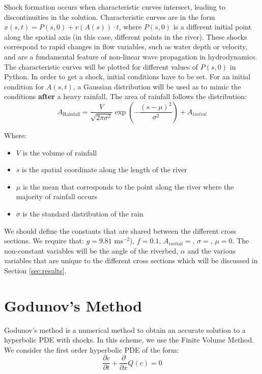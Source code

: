\documentclass[12pt]{article}
\begin{document}
Shock formation occurs when characteristic curves intersect, leading to discontinuities in the solution. Characteristic curves are in the form $ x(s, t) = P(s, 0) + v(A(s))\cdot t$, where $P(s, 0)$ is a different initial point along the spatial axis (in this case, different points in the river). These shocks correspond to rapid changes in flow variables, such as water depth or velocity, and are a fundamental feature of non-linear wave propagation in hydrodynamics. The characteristic curves will be plotted for different values of $P(s, 0)$ in Python. In order to get a shock, initial conditions have to be set. For an initial condition for $A(s, t)$, a Gaussian distribution will be used as to mimic the conditions \textbf{after} a heavy rainfall. The area of rainfall follows the distribution:
\begin{equation}
     A_\text{Rainfall} = \frac{V}{\sqrt{2\pi\sigma^2}}\exp{\left(-\frac{(s - \mu)^2}{\sigma^2}\right)} + A_{initial}
\end{equation}

Where:
\begin{itemize}
    \item $V$ is the volume of rainfall
    \item $s$ is the spatial coordinate along the length of the river
    \item $\mu$ is the mean that corresponds to the point along the river where the majority of rainfall occurs
    \item $\sigma$ is the standard distribution of the rain
\end{itemize}

We should define the constants that are shared between the different cross sections. We require that: $g = 9.81 \text{ ms}^{-2}$), $f = 0.1$, $A_{initial} = $, $\sigma = $, $\mu  = 0$. The non-constant variables will be the angle of the riverbed, $\alpha$ and the various variables that are unique to the different cross sections which will be discussed in Section \ref{sec:results}.

\section{Godunov's Method}
Godunov's method is a numerical method to obtain an accurate solution to a hyperbolic PDE with shocks. In this scheme, we use the Finite Volume Method. We consider the first order hyperbolic PDE of the form:
\begin{equation}
    \frac{\partial c}{\partial t} + \frac{\partial}{\partial x}Q(c) = 0
\end{equation}
\end{document}
